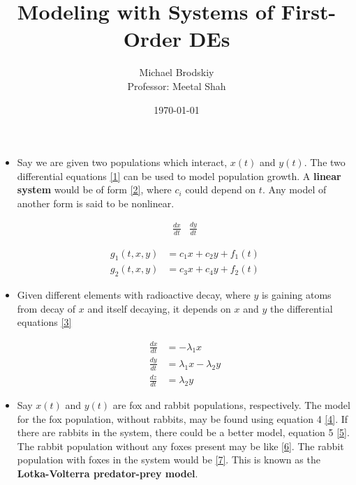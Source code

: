 \documentclass[12pt]{article}
\title{Modeling with Systems of First-Order DEs}
\date{\today}
\author{Michael Brodskiy\\ \small Professor: Meetal Shah}
\begin{document}
\maketitle

\begin{itemize}

  \item Say we are given two populations which interact, $x(t)$ and $y(t)$. The two differential equations \eqref{1} can be used to model population growth. A \textbf{linear system} would be of form \eqref{2}, where $c_i$ could depend on $t$. Any model of another form is said to be nonlinear.

    \begin{equation}
      \begin{split}
        \frac{dx}{dt} & \frac{dy}{dt}
      \end{split}
      \label{1}
    \end{equation}

    \begin{equation}
      \begin{split}
        g_1(t,x,y) & = c_1x+c_2y+f_1(t) \\
        g_2(t,x,y) & = c_3x+c_4y+f_2(t)
      \end{split}
      \label{2}
    \end{equation}


  \item Given different elements with radioactive decay, where $y$ is gaining atoms from decay of $x$ and itself decaying, it depends on $x$ and $y$ the differential equations \eqref{3}

    \begin{equation}
      \begin{split}
        \frac{dx}{dt} & = -\lambda_1x \\
        \frac{dy}{dt} & = \lambda_1x-\lambda_2y \\
        \frac{dz}{dt} & = \lambda_2y 
      \end{split}
      \label{3}
    \end{equation}

  \item Say $x(t)$ and $y(t)$ are fox and rabbit populations, respectively. The model for the fox population, without rabbits, may be found using equation 4 \eqref{4}. If there are rabbits in the system, there could be a better model, equation 5 \eqref{5}. The rabbit population without any foxes present may be like \eqref{6}. The rabbit population with foxes in the system would be \eqref{7}. This is known as the \textbf{Lotka-Volterra predator-prey model}.


\end{itemize}
\end{document}
